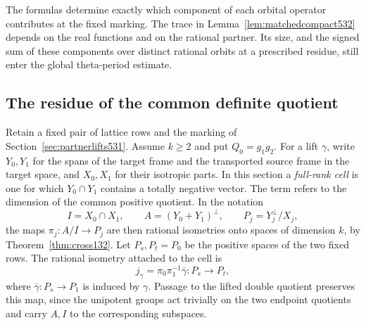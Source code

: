 \documentclass[a4paper,11pt]{article}
\theoremstyle{definition}
\theoremstyle{remark}
\numberwithin{equation}{section}
\begin{document}
The formulas determine exactly which component of each orbital
operator contributes at the fixed marking. The trace in
Lemma~\ref{lem:matchedcompact532} depends on the real functions
and on the rational partner. Its size, and the signed sum of
these components over distinct rational orbits at a prescribed
residue, still enter the global theta-period estimate.


\subsection{The residue of the common definite quotient}
\label{sec:fullrankresidue533}

Retain a fixed pair of lattice rows and the marking of
Section~\ref{sec:partnerlifts531}. Assume \(k\ge2\) and put
\(Q_0=g_1g_2\). For a
lift \(\gamma\), write \(Y_0,Y_1\) for the spans of the target
frame and the transported source frame in the target space, and
\(X_0,X_1\) for their isotropic parts. In this section a
\emph{full-rank cell} is one for which \(Y_0\cap Y_1\) contains
a totally negative vector. The term refers to the dimension of
the common positive quotient. In the notation
\[
 I=X_0\cap X_1,\qquad A=(Y_0+Y_1)^\perp,\qquad
 P_j=Y_j^\perp/X_j ,
\]
the maps \(\pi_j:A/I\to P_j\) are then rational isometries onto
spaces of dimension \(k\), by Theorem~\ref{thm:cross132}.
Let \(P_s,P_t=P_0\) be the positive spaces of the two fixed rows.
The rational isometry attached to the cell is
\[
          j_\gamma=\pi_0\pi_1^{-1}\bar\gamma:P_s\longrightarrow P_t ,
\]
where \(\bar\gamma:P_s\to P_1\) is induced by \(\gamma\).
Passage to the lifted double quotient preserves this map,
since the unipotent groups act trivially on the two endpoint
quotients and carry \(A,I\) to the corresponding subspaces.
\end{document}
